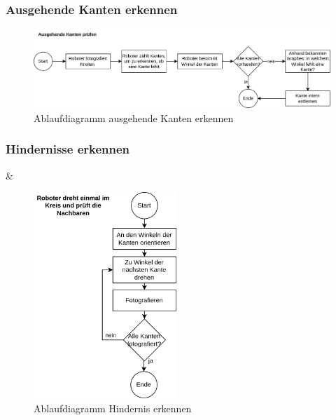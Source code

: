 \subsubsection{Ausgehende Kanten erkennen}

\begin{figure}[H]
\centering
\includegraphics[width=\textwidth]{assets/gesamtkonzept/ablaufdiagramm-kanten-erkennen.png}
\caption{Ablaufdiagramm ausgehende Kanten erkennen}
\label{fig:ablaufdiagramm-kanten-erkennen}
\end{figure}

\subsubsection{Hindernisse erkennen}

\begin{table}[h!]
\centering
\begin{tabularx}\textwidth{X  X }
& \begin{figure}[H]
\centering
\includegraphics[width=0.48\textwidth]{assets/gesamtkonzept/ablaufdiagramm-hindernisse-erkennen.png}
\caption{Ablaufdiagramm Hindernis erkennen}
\label{fig:ablaufdiagramm-hindernis-erkennen}
\end{figure}
 \\

\end{tabularx}
\end{table}




